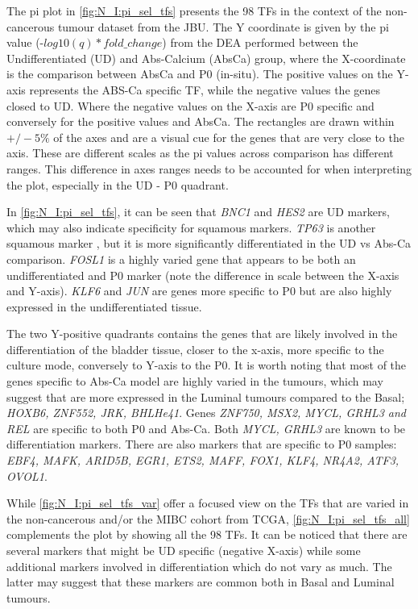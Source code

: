 The pi plot in \cref{fig:N_I:pi_sel_tfs} presents the 98 TFs in the context of the non-cancerous tumour dataset from the JBU. The Y coordinate is given by the pi value (-$log10(q)*fold\_change$) from the DEA performed between the Undifferentiated (UD) and Abs-Calcium (AbsCa) group, where the X-coordinate is the comparison between AbsCa and P0 (in-situ). The positive values on the Y-axis represents the ABS-Ca specific TF, while the negative values the genes closed to UD. Where the negative values on the X-axis are P0 specific and conversely for the positive values and AbsCa. The rectangles are drawn  within $+/-5\%$ of the axes and are a visual cue for the genes that are very close to the axis. These are different scales as the pi values across comparison has different ranges. This difference in axes ranges needs to be accounted for when interpreting the plot, especially in the UD - P0 quadrant. 

In \cref{fig:N_I:pi_sel_tfs}, it can be seen that \textit{BNC1} and \textit{HES2} are UD markers, which may also indicate specificity for squamous markers. \textit{TP63} is another squamous marker \cite{Robertson2017-mg}, but it is more significantly differentiated in the UD vs Abs-Ca comparison. \textit{FOSL1} is a highly varied gene that appears to be both an undifferentiated and P0 marker (note the difference in scale between the X-axis and Y-axis). \textit{KLF6} and \textit{JUN} are genes more specific to P0 but are also highly expressed in the undifferentiated tissue.


The two Y-positive quadrants contains the genes that are likely involved in the differentiation of the bladder tissue, closer to the x-axis, more specific to the culture mode, conversely to Y-axis to the P0. It is worth noting that most of the genes specific to Abs-Ca model are highly varied in the tumours, which may suggest that are more expressed in the Luminal tumours compared to the Basal; \textit{HOXB6, ZNF552, JRK, BHLHe41}. Genes \textit{ZNF750, MSX2, MYCL, GRHL3 and REL} are specific to both P0 and Abs-Ca. Both \textit{MYCL, GRHL3} are known to be differentiation markers. There are also markers that are specific to P0 samples: \textit{EBF4, MAFK, ARID5B, EGR1, ETS2, MAFF, FOX1, KLF4, NR4A2, ATF3, OVOL1}. 

While \cref{fig:N_I:pi_sel_tfs_var} offer a focused view on the TFs that are varied in the non-cancerous and/or the MIBC cohort from TCGA, \cref{fig:N_I:pi_sel_tfs_all} complements the plot by showing all the 98 TFs. It can be noticed that there are several markers that might be UD specific (negative X-axis) while some additional markers involved in differentiation which do not vary as much. The latter may suggest that these markers are common both in Basal and Luminal tumours. 

